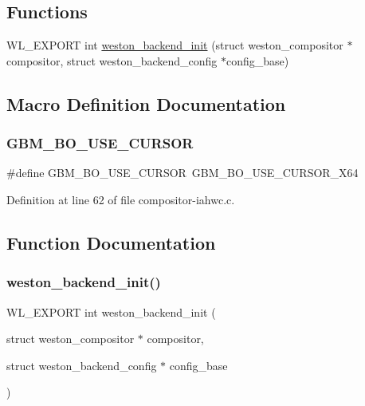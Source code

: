 \subsection*{Functions}
\begin{DoxyCompactItemize}
\item 
W\+L\+\_\+\+E\+X\+P\+O\+RT int \mbox{\hyperlink{compositor-iahwc_8c_aa8d8304b0b4395de692301f67143b3d5}{weston\+\_\+backend\+\_\+init}} (struct weston\+\_\+compositor $\ast$compositor, struct weston\+\_\+backend\+\_\+config $\ast$config\+\_\+base)
\end{DoxyCompactItemize}


\subsection{Macro Definition Documentation}
\mbox{\label{compositor-iahwc_8c_ad3aff0f2f31aa1b2db0e50458b5f742c}} 
\subsubsection{\texorpdfstring{G\+B\+M\+\_\+\+B\+O\+\_\+\+U\+S\+E\+\_\+\+C\+U\+R\+S\+OR}{GBM\_BO\_USE\_CURSOR}}
{\footnotesize\ttfamily \#define G\+B\+M\+\_\+\+B\+O\+\_\+\+U\+S\+E\+\_\+\+C\+U\+R\+S\+OR~G\+B\+M\+\_\+\+B\+O\+\_\+\+U\+S\+E\+\_\+\+C\+U\+R\+S\+O\+R\+\_\+X64}



Definition at line 62 of file compositor-\/iahwc.\+c.



\subsection{Function Documentation}
\mbox{\label{compositor-iahwc_8c_aa8d8304b0b4395de692301f67143b3d5}} 
\subsubsection{\texorpdfstring{weston\+\_\+backend\+\_\+init()}{weston\_backend\_init()}}
{\footnotesize\ttfamily W\+L\+\_\+\+E\+X\+P\+O\+RT int weston\+\_\+backend\+\_\+init (\begin{DoxyParamCaption}\item[{struct weston\+\_\+compositor $\ast$}]{compositor,  }\item[{struct weston\+\_\+backend\+\_\+config $\ast$}]{config\+\_\+base }\end{DoxyParamCaption})}



